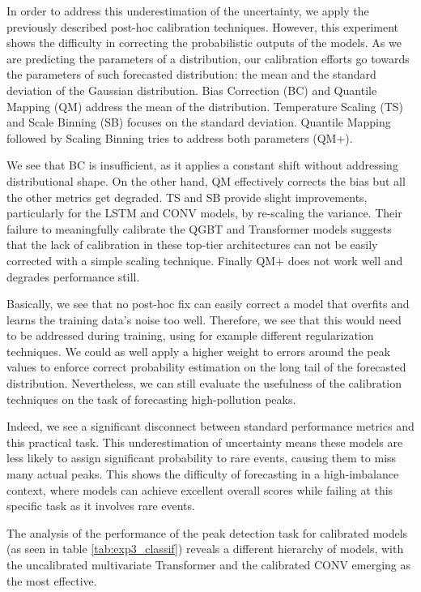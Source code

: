\documentclass[12pt,a4paper]{book}
\begin{document}
In order to address this underestimation of the uncertainty, we apply the previously described post-hoc calibration techniques. However, this experiment shows the difficulty in correcting the probabilistic outputs of the models. As we are predicting the parameters of a distribution, our calibration efforts go towards the parameters of such forecasted distribution: the mean and the standard deviation of the Gaussian distribution. Bias Correction (BC) and Quantile Mapping (QM) address the mean of the distribution. Temperature Scaling (TS) and Scale Binning (SB) focuses on the standard deviation. Quantile Mapping followed by Scaling Binning tries to address both parameters (QM+).

We see that BC is insufficient, as it applies a constant shift without addressing distributional shape. On the other hand, QM effectively corrects the bias but all the other metrics get degraded. TS and SB provide slight improvements, particularly for the LSTM and CONV models, by re-scaling the variance. Their failure to meaningfully calibrate the QGBT and Transformer models suggests that the lack of calibration in these top-tier architectures can not be easily corrected with a simple scaling technique. Finally QM+ does not work well and degrades performance still. 

Basically, we see that no post-hoc fix can easily correct a model that overfits and learns the training data's noise too well. Therefore, we see that this would need to be addressed during training, using for example different regularization techniques. We could as well apply a higher weight to errors around the peak values to enforce correct probability estimation on the long tail of the forecasted distribution. Nevertheless, we can still evaluate the usefulness of the calibration techniques on the task of forecasting high-pollution peaks.

Indeed, we see a significant disconnect between standard performance metrics and this practical task. This underestimation of uncertainty means these models are less likely to assign significant probability to rare events, causing them to miss many actual peaks. This shows the  difficulty of forecasting in a high-imbalance context, where models can achieve excellent overall scores while failing at this specific task as it involves rare events. 

The analysis of the performance of the peak detection task for calibrated models (as seen in table \ref{tab:exp3_classif}) reveals a different hierarchy of models, with the uncalibrated multivariate Transformer and the calibrated CONV emerging as the most effective. 
\end{document}
